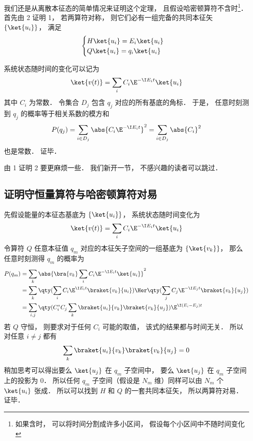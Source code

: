 我们还是从离散本征态的简单情况来证明这个定理， 且假设哈密顿算符不含时\footnote{如果含时， 可以将时间分割成许多小区间， 假设每个小区间中不随时间变化}． 首先由 2 证明 1， 若两算符对称， 则它们必有一组完备的共同本征矢 $\{\ket{u_i}\}$， 满足
\begin{equation}
\begin{cases}
H \ket{u_i} = E_i \ket{u_i}\\
Q \ket{u_i} = q_i \ket{u_i}
\end{cases}
\end{equation}

系统状态随时间的变化可以记为
\begin{equation}
\ket{v(t)} = \sum_i C_i \E^{-\I E_i t} \ket{u_i}
\end{equation}
其中 $C_i$ 为常数． 令集合 $D_j$ 包含 $q_j$ 对应的所有基底的角标． 于是， 任意时刻测到 $q_j$ 的概率等于相关系数的模方和
\begin{equation}
P(q_j) = \sum_{i \in D_j} \abs{C_i \E^{-\I E_i t}}^2 = \sum_{i \in D_j} \abs{C_i}^2
\end{equation}
也是常数． 证毕．

由 1 证明 2 要更麻烦一些． 我们新开一节， 不感兴趣的读者可以跳过．

\subsection{证明守恒量算符与哈密顿算符对易}
先假设能量的本征态基底为 $\{\ket{u_i}\}$， 系统状态随时间变化为
\begin{equation}
\ket{v(t)} = \sum_i C_i \E^{-\I E_i t} \ket{u_i}
\end{equation}
令算符 $Q$ 任意本征值 $q_m$ 对应的本征矢子空间的一组基底为 $\{\ket{v_k}\}$， 那么任意时刻测得 $q_m$ 的概率为
\begin{equation}
\begin{aligned}
P(q_m) &= \sum_k \abs{\bra{v_k} \sum_i C_i \E^{-\I E_i t} \ket{u_i}}^2\\
&= \sum_k \qty(\sum_i C_i \E^{\I E_i t} \braket{v_k}{u_i})\Her \qty(\sum_j C_j \E^{-\I E_j t} \braket{v_k}{u_j})\\
&= \sum_{i,j} \qty( C_i^* C_j \sum_k \braket{u_i}{v_k} \braket{v_k}{u_j}) \E^{\I (E_i - E_j) t}
\end{aligned}
\end{equation}
若 $Q$ 守恒， 则要求对于任何 $C_i$ 可能的取值， 该式的结果都与时间无关． 所以对任意 $i \ne j$ 都有
\begin{equation}
\sum_k \braket{u_i}{v_k} \braket{v_k}{u_j} = 0
\end{equation}
稍加思考可以得出要么 $\ket{u_j}$ 在 $q_m$ 子空间中， 要么 $\ket{u_j}$ 在 $q_m$ 子空间上的投影为 0． 所以任何 $q_m$ 子空间（假设是 $N_m$ 维）同样可以由 $N_m$ 个 $\ket{u_i}$ 张成． 所以可以找到 $H$ 和 $Q$ 的一套共同本征矢， 所以两算符对易． 证毕．

